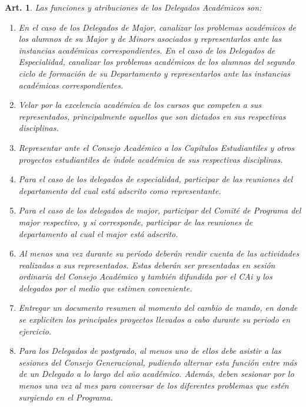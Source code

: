 \documentclass[letterpaper,11pt]{article}
\theoremstyle{plain}
\newtheorem{art}{Art.} %
\begin{document}
		\begin{art}\label{funcionesDelegadosAcademicos}
			Las funciones y atribuciones de los Delegados Académicos son:
			\begin{enumerate}
				\item En el caso de los Delegados de Major, canalizar los problemas académicos de los alumnos de su Major y de Minors asociados y representarlos ante las instancias académicas correspondientes. En el caso de los Delegados de Especialidad, canalizar los problemas académicos de los alumnos del segundo ciclo de formación de su Departamento y representarlos ante las instancias académicas correspondientes.
				\item Velar por la excelencia académica de los cursos que competen a sus representados, principalmente aquellos que son dictados en sus respectivas disciplinas.
				\item Representar ante el Consejo Académico a los Capítulos Estudiantiles y otros proyectos estudiantiles de índole académica de sus respectivas disciplinas.
				\item Para el caso de los delegados de especialidad, participar de las reuniones del departamento del cual está adscrito como representante.
				\item Para el caso de los delegados de major, participar del  Comité de Programa del major respectivo, y si corresponde, participar de las reuniones de departamento al cual el major está adscrito.
				\item Al menos una vez durante su período deberán rendir cuenta de las actividades realizadas a sus representados. Estas deberán ser presentadas en sesión ordinaria del Consejo Académico y también difundida por el CAi  y los delegados por el medio que estimen conveniente.
				\item Entregar un documento resumen al momento del cambio de mando, en donde se expliciten los principales proyectos llevados a cabo durante su periodo en ejercicio.
				\item Para los Delegados de postgrado, al menos uno de ellos debe asistir a las sesiones del Consejo Generacional, pudiendo alternar esta función entre más de un Delegado a lo largo del año académico. Además, deben sesionar por lo menos una vez al mes para conversar de los diferentes problemas que estén surgiendo en el Programa.
			\end{enumerate}
		\end{art}
\end{document}
